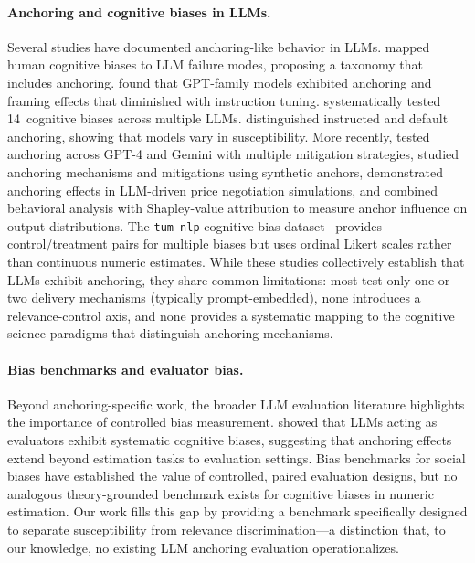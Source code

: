 \paragraph{Anchoring and cognitive biases in LLMs.}
Several studies have documented anchoring-like behavior in LLMs.
\citet{jones2022capturing} mapped human cognitive biases to LLM
failure modes, proposing a taxonomy that includes anchoring.
\citet{hagendorff2023humanlike} found that GPT-family models
exhibited anchoring and framing effects that diminished with
instruction tuning.
\citet{echterhoff-etal-2024-cognitive} systematically tested
14~cognitive biases across multiple LLMs.
\citet{itzhak2023instructed} distinguished instructed and
default anchoring, showing that models vary in susceptibility.
More recently, \citet{lou2024anchoring} tested anchoring across
GPT-4 and Gemini with multiple mitigation strategies,
\citet{huang2025anchoring} studied anchoring mechanisms and
mitigations using synthetic anchors,
\citet{takenami2025anchoring} demonstrated anchoring effects in
LLM-driven price negotiation simulations,
and \citet{valencia2025anchors} combined behavioral analysis
with Shapley-value attribution to measure anchor influence on
output distributions.
The \texttt{tum-nlp} cognitive bias
dataset~\citep{malberg-etal-2025-comprehensive} provides
control/treatment pairs for multiple biases but uses ordinal
Likert scales rather than continuous numeric estimates.
While these studies collectively establish that LLMs exhibit
anchoring, they share common limitations: most test only one
or two delivery mechanisms (typically prompt-embedded), none
introduces a relevance-control axis, and none provides a
systematic mapping to the cognitive science paradigms that
distinguish anchoring mechanisms.

\paragraph{Bias benchmarks and evaluator bias.}
Beyond anchoring-specific work, the broader LLM evaluation
literature highlights the importance of controlled bias
measurement.
\citet{koo2024benchmarking} showed that LLMs acting as
evaluators exhibit systematic cognitive biases, suggesting that
anchoring effects extend beyond estimation tasks to evaluation
settings.
Bias benchmarks for social biases have established the value of
controlled, paired evaluation designs, but no analogous
theory-grounded benchmark exists for cognitive biases in numeric
estimation.
Our work fills this gap by providing a benchmark specifically
designed to separate susceptibility from relevance
discrimination---a distinction that, to our knowledge, no
existing LLM anchoring evaluation operationalizes.

